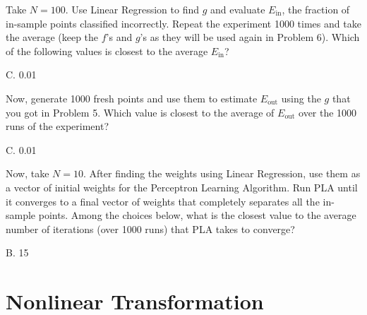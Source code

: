\documentclass[answers]{exam}
\begin{document}
\begin{questions}
\setcounter{question}{4}

\question Take $N = 100$. Use Linear Regression to find $g$ and evaluate 
$E_{\text{in}}$, the fraction of in-sample points classified incorrectly. Repeat 
the experiment 1000 times and take the average (keep the $f$'s and $g$'s as they 
will be used again in Problem 6). Which of the following values is closest to the 
average $E_{\text{in}}$?
\begin{choices}
\end{choices}

\begin{solution}
    C. 0.01
\end{solution}

\question Now, generate 1000 fresh points and use them to estimate $E_{\text{out}}$ 
using the $g$ that you got in Problem 5. Which value is closest to the average of 
$E_{\text{out}}$ over the 1000 runs of the experiment?
\begin{choices}
\end{choices}

\begin{solution}
    C. 0.01
\end{solution}

\question Now, take $N = 10$. After finding the weights using Linear Regression, 
use them as a vector of initial weights for the Perceptron Learning Algorithm. 
Run PLA until it converges to a final vector of weights that completely separates 
all the in-sample points. Among the choices below, what is the closest value to 
the average number of iterations (over 1000 runs) that PLA takes to converge?
\begin{choices}
\end{choices}

\begin{solution}
    
\end{solution}
    B. 15
\end{questions}

\section*{Nonlinear Transformation}
\end{document}
